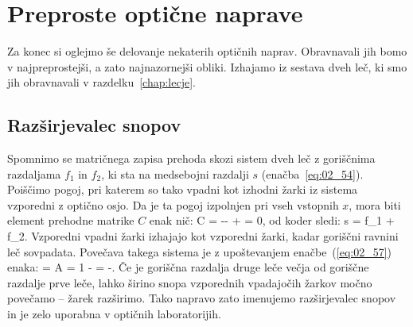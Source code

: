 \section{Preproste optične naprave}
Za konec si oglejmo še delovanje nekaterih optičnih naprav. Obravnavali jih bomo 
v najpreprostejši, a zato najnazornejši obliki. Izhajamo iz sestava dveh leč, ki 
smo jih obravnavali v razdelku~\ref{chap:lecje}. 

\subsection*{Razširjevalec snopov}
Spomnimo se matričnega zapisa prehoda skozi sistem dveh leč z goriščnima razdaljama
$f_1$ in $f_2$, ki sta na medsebojni razdalji $s$ (enačba~\ref{eq:02_54}). Poiščimo
pogoj, pri katerem so tako vpadni kot izhodni žarki iz sistema vzporedni z optično osjo.
Da je ta pogoj izpolnjen pri vseh vstopnih $x$, mora biti 
element prehodne matrike $C$ enak nič:
\beq
C = -- +  = 0,
\label{eq:02_65}
\eeq
od koder sledi:
\beq
s = f_1 + f_2.
\label{eq:02_57}
\eeq
Vzporedni vpadni žarki izhajajo kot vzporedni žarki, kadar goriščni ravnini leč sovpadata.
Povečava takega sistema je z upoštevanjem enačbe~(\ref{eq:02_57}) enaka:
\beq
{} = A = 1 -  = -.
\label{eq:02_58}
\eeq
Če je goriščna razdalja druge leče večja od goriščne razdalje prve leče, 
lahko širino snopa vzporednih vpadajočih žarkov močno povečamo -- žarek razširimo.
Tako napravo zato imenujemo razširjevalec snopov in je zelo uporabna v optičnih laboratorijih.

